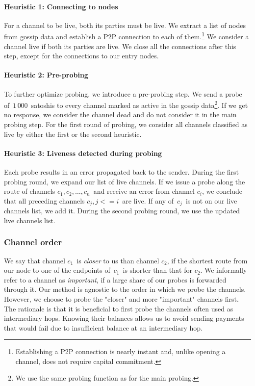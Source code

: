 \paragraph{Heuristic 1: Connecting to nodes}
For a channel to be live, both its parties must be live.
We extract a list of nodes from gossip data and establish a P2P connection to each of them.\footnote{Establishing a P2P connection is nearly instant and, unlike opening a channel, does not require capital commitment.}
We consider a channel live if both its parties are live.
We close all the connections after this step, except for the connections to our entry nodes.

\paragraph{Heuristic 2: Pre-probing}
To further optimize probing, we introduce a pre-probing step.
We send a probe of~$1\,000$~satoshis to every channel marked as active in the gossip data\footnote{We use the same probing function as for the main probing.}.
If we get no response, we consider the channel dead and do not consider it in the main probing step.
For the first round of probing, we consider all channels classified as live by either the first or the second heuristic.

\paragraph{Heuristic 3: Liveness detected during probing}
Each probe results in an error propagated back to the sender.
During the first probing round, we expand our list of live channels.
If we issue a probe along the route of channels $c_1, c_2, \dots, c_n$~and receive an error from channel $c_i$, we conclude that all preceding channels $c_j, j<=i$~are live.
If any of~$c_j$~is not on our live channels list, we add it.
During the second probing round, we use the updated live channels list.


\subsubsection*{Channel order}
We say that channel $c_1$~is \textit{closer} to us than channel $c_2$, if the shortest route from our node to one of the endpoints of~$c_1$~is shorter than that for $c_2$.
We informally refer to a channel as \textit{important}, if a large share of our probes is forwarded through it.
Our method is agnostic to the order in which we probe the channels.
However, we choose to probe the "closer" and more "important" channels first.
The rationale is that it is beneficial to first probe the channels often used as intermediary hops.
Knowing their balances allows us to avoid sending payments that would fail due to insufficient balance at an intermediary hop.

